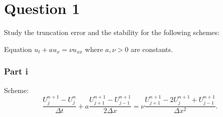 \section{Question 1}

\begin{question}
    Study the truncation error and the stability for the following schemes:
    
    Equation $u_t+a u_x= \nu u_{x x}$ where $a, \nu > 0$ are constants.
\end{question}

\subsubsection{Part i}

\begin{question}
    Scheme: 
    $$\frac{U_j^{n+1}-U_j^n}{\Delta t}+a \frac{U_{j+1}^{n+1}-U_{j-1}^{n+1}}{2 \Delta x}=\nu \frac{U_{j+1}^{n+1}-2 U_j^{n+1}+U_{j-1}^{n+1}}{\Delta x^2}.$$
\end{question}

